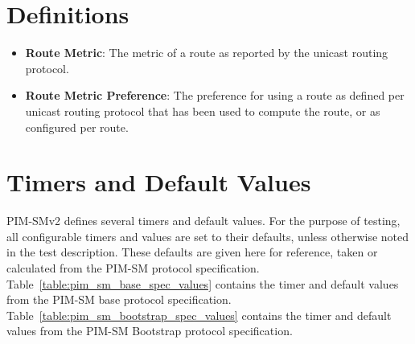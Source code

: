 \documentclass[11pt]{report}
\begin{document}
\section{Definitions}

\begin{itemize}
  \item {\bf Route Metric}: The metric of a route as reported by the unicast
  routing protocol.

  \item {\bf Route Metric Preference}: The preference for using a route as
  defined per unicast routing protocol that has been used to compute the
  route, or as configured per route.

\end{itemize}

\section{Timers and Default Values}
PIM-SMv2 defines several timers and default values. For the purpose of
testing, all configurable timers and values are set to their defaults, unless
otherwise noted in the test description. These defaults are given here for
reference, taken or calculated from the PIM-SM
protocol specification.
Table~\ref{table:pim_sm_base_spec_values} contains the timer and default values
from the PIM-SM base protocol specification.
Table~\ref{table:pim_sm_bootstrap_spec_values} contains the timer and default
values from the PIM-SM Bootstrap protocol specification.

%
%
\newcommand{\PimsmVersionDefault}{PIM-SMv2}	       %
\newcommand{\PimsmLanDelayDefault}{0.5 sec}		%
\newcommand{\PimsmTOverrideDefault}{2.5 sec}		%
\newcommand{\PimsmHelloPeriod}{30 sec}			%
\newcommand{\PimsmTriggeredHelloDelay}{5 sec}		%
\newcommand{\PimsmDefaultHelloHoldtime}{105 sec}       %
\newcommand{\PimsmHelloHoldtime}{105 sec}		%
\newcommand{\PimsmJPHoldTime}{210}			%
\newcommand{\PimsmJPOverrideIntervalI}{3 sec}	     %
\newcommand{\PimsmAssertOverrideInterval}{3 sec}     %
\newcommand{\PimsmAssertTime}{180 sec}			%
\newcommand{\PimsmTPeriodic}{60 sec}			%
\newcommand{\PimsmTSuppressed}{rand(66, 84) sec}	%
\newcommand{\PimsmTOverride}{rand(0, 2.5) sec}		%
\newcommand{\PimsmKeepalivePeriod}{210 sec}		%
\newcommand{\PimsmRPKeepalivePeriod}{185 sec}		%
\newcommand{\PimsmRegisterSuppressionTime}{60 sec}  %
\newcommand{\PimsmRegisterProbeTime}{5 sec}		%
\end{document}
